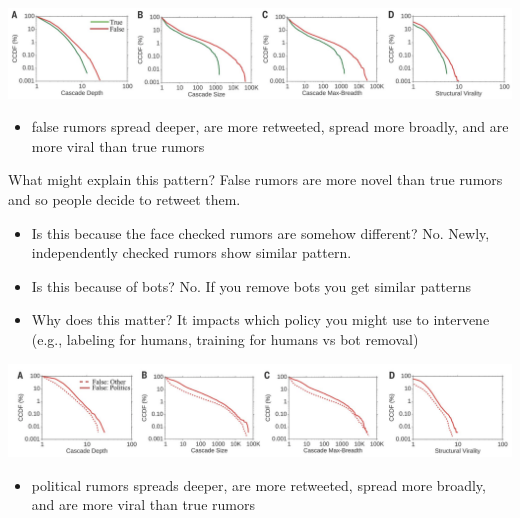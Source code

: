\documentclass[aspectratio=169]{beamer}
\begin{document}
\begin{frame} 

\begin{center}
\includegraphics[width=\textwidth]{figures/vosoughi_spread_2018_fig2ad}
\end{center}

\begin{itemize}
\item false rumors spread deeper, are more retweeted, spread more broadly, and are more viral than true rumors
\end{itemize}

\end{frame}
\begin{frame} 

What might explain this pattern?  \pause False rumors are more novel than true rumors and so people decide to retweet them.

\end{frame}
\begin{frame} 

\begin{itemize}
\item Is this because the face checked rumors are somehow different? \pause No. Newly, independently checked rumors show similar pattern. \pause
\item Is this because of bots? \pause No. If you remove bots you get similar patterns \pause
\item Why does this matter? \pause It impacts which policy you might use to intervene (e.g., labeling for humans, training for humans vs bot removal)
\end{itemize}

\end{frame}
\begin{frame} 

\begin{center}
\includegraphics[width=\textwidth]{figures/vosoughi_spread_2018_fig3ad}
\end{center}

\begin{itemize}
\item political rumors spreads deeper, are more retweeted, spread more broadly, and are more viral than true rumors
\end{itemize}

\end{frame}
\end{document}
